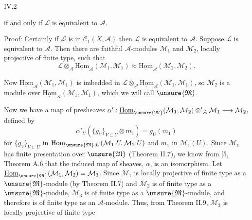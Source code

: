 IV.2

if and only if $\mathcal{L}$ is equivalent to $\mathcal{A}$.

\uline{Proof:} Certainly if $\mathcal{L}$ is in $\mathcal{C}_1(X,\mathcal{A})$ then $\mathcal{L}$ is equivalent to $\mathcal{A}$. Suppose $\mathcal{L}$ is equivalent to $\mathcal{A}$. Then there are faithful $\mathcal{A}$-modules $\mathcal{M}_1$ and $\mathcal{M}_2$, locally projective of finite type, such that
\[
\mathcal{L}\otimes_{\mathcal{A}}\underline{\mathrm{Hom}}_{\mathcal{A}}(\mathcal{M}_1,\mathcal{M}_1)\approx\underline{\mathrm{Hom}}_{\mathcal{A}}(\mathcal{M}_2,\mathcal{M}_2).
\]

Now $\underline{\mathrm{Hom}}_{\mathcal{A}}(\mathcal{M}_1,\mathcal{M}_1)$ is imbedded in $\mathcal{L}\otimes_{\mathcal{A}}\underline{\mathrm{Hom}}_{\mathcal{A}}(\mathcal{M}_1,\mathcal{M}_1)$, so $\mathcal{M}_2$ is a module over $\underline{\mathrm{Hom}}_{\mathcal{A}}(\mathcal{M}_1,\mathcal{M}_1)$, which we will call $\unsure{\mathfrak{M}}$.

Now we have a map of presheaves $\alpha':\underline{\mathrm{Hom}}_{\unsure{\mathfrak{M}}}(\mathcal{M}_1,\mathcal{M}_2)\mathbin{\otimes'}_{\mathcal{A}}\mathcal{M}_1\longrightarrow\mathcal{M}_2$, defined by
\[
\alpha'_U(\{g_V\}_{V\subset U}\otimes m_1)=g_U(m_1)
\]
for $\{g_V\}_{V\subset U}$ in $\mathrm{Hom}_{\unsure{\mathfrak{M}}|U}(\mathcal{M}_1|U,\mathcal{M}_2|U)$ and $m_1$ in $\mathcal{M}_1(U)$. Since $\mathcal{M}_1$ has finite presentation over $\unsure{\mathfrak{M}}$ (Theorem II.7), we know from [5, Theorem A.6]that the induced map of sheaves, $\alpha$, is an isomorphism. Let $\underline{\mathrm{Hom}}_{\unsure{\mathfrak{M}}}(\mathcal{M}_1,\mathcal{M}_2)=\mathcal{M}_3$. Since $\mathcal{M}_1$ is locally projective of finite type as a $\unsure{\mathfrak{M}}$-module (by Theorem II.7) and $\mathcal{M}_2$ is of finite type as a $\unsure{\mathfrak{M}}$-module, $\mathcal{M}_3$ is of finite type as a $\unsure{\mathfrak{M}}$-module, and therefore is of finite type as an $\mathcal{A}$-module. Thus, from Theorem II.9, $\mathcal{M}_3$ is locally projective of finite type

